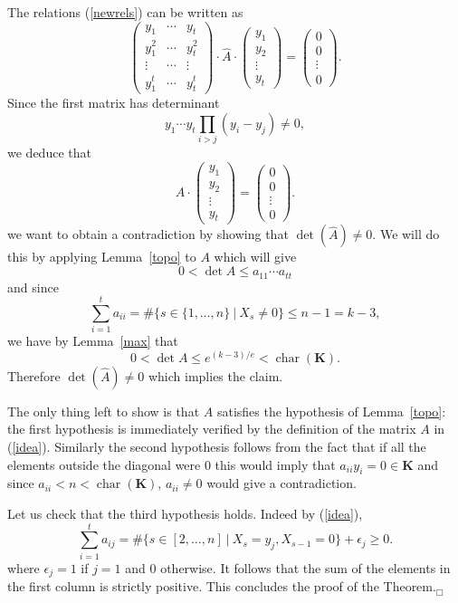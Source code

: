 \documentclass[a4paper,twoside]{article}
\begin{document}
The relations (\ref{newrels}) can be written
as
$$\left(\begin{array}{ccc}
y_1 &  \cdots & y_t\\
y_1^2& \cdots & y_t^2\\
\vdots  &\cdots & \vdots\\
y_1^t & \cdots & y_t^t
\end{array}\right)\cdot
\hat{A}\cdot
\left(
\begin{array}{c}y_1\\y_2\\\vdots\\y_t\end{array}
\right)=
\left(\begin{array}{c}0\\0\\\vdots\\0\end{array}\right).$$
Since the first matrix has determinant
$$y_1\cdots y_t\prod_{i>j}(y_i-y_j)\neq0,$$
we deduce that
$$\hat{A}\cdot
\left(
\begin{array}{c}y_1\\y_2\\\vdots\\y_t\end{array}
\right)=
\left(\begin{array}{c}0\\0\\\vdots\\0\end{array}\right).$$
we want to obtain a contradiction by showing that $\det(\hat{A})\neq 0$.
We will do this by applying Lemma~\ref{topo} to $A$ which will give
$$0<\det A\leq a_{11}\cdots a_{tt}$$
and since
$$\sum_{i=1}^ta_{ii}=\#\{s\in\{1,\ldots,n\}\ |\ X_s\neq0\}\leq n-1=k-3,$$
we have by Lemma~\ref{max} that
$$0<\det A \leq e^{(k-3)/e}< \operatorname{char}(\mathbf K).$$
Therefore $\det(\hat{A})\neq0$ which implies the claim.

The only thing left to show is that $A$ satisfies the hypothesis
of Lemma~\ref{topo}: the first hypothesis is immediately verified
by the definition of the matrix $A$ in (\ref{idea}). Similarly the
second hypothesis follows from the fact that if all the elements
outside the diagonal were $0$ this would imply that
$a_{ii}y_i=0\in\mathbf K$ and since
$a_{ii}<n<\operatorname{char}(\mathbf K)$, $a_{ii}\neq0$ would
give a contradiction.

Let us check that the third hypothesis holds. Indeed by (\ref{idea}),
$${\sum_{i=1}^t a_{ij}}=\#\{s\in[2,\ldots,n]\ |\ X_{s}=y_j, X_{s-1}=0\}+\epsilon_j\geq0.$$
where $\epsilon_j=1$ if $j=1$ and $0$ otherwise. It follows that the sum
of the elements in the first column is strictly positive.
This concludes the proof of the Theorem.\hfill$_\Box$\medskip
\end{document}
